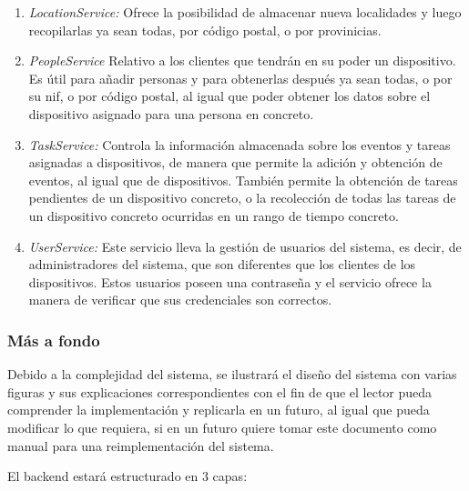 \begin{enumerate}
            \item\textit{LocationService:}
            Ofrece la posibilidad de almacenar nueva localidades y luego recopilarlas ya sean todas, por código postal, o por provinicias.
            
            \item\textit{PeopleService}
            Relativo a los clientes que tendrán en su poder un dispositivo. Es útil para añadir personas y para obtenerlas después ya sean todas, o por su nif, o por código postal, al igual que poder obtener los datos sobre el dispositivo asignado para una persona en concreto.
            
            \item\textit{TaskService:} Controla la información almacenada sobre los eventos y tareas asignadas a dispositivos, de manera que permite la adición y obtención de eventos, al igual que de dispositivos. También permite la obtención de tareas pendientes de un dispositivo concreto, o la recolección de todas las tareas de un dispositivo concreto ocurridas en un rango de tiempo concreto.
            
            \item\textit{UserService:} Este servicio lleva la gestión de usuarios del sistema, es decir, de administradores del sistema, que son diferentes que los clientes de los dispositivos. Estos usuarios poseen una contraseña y el servicio ofrece la manera de verificar que sus credenciales son correctos.
            
        \end{enumerate}
    \subsubsection{Más a fondo}
    
    Debido a la complejidad del sistema, se ilustrará el diseño del sistema con varias figuras y sus explicaciones correspondientes con el fin de que el lector pueda comprender la implementación y replicarla en un futuro, al igual que pueda modificar lo que requiera, si en un futuro quiere tomar este documento como manual para una reimplementación del sistema.
    
    El backend estará estructurado en 3 capas:
    
